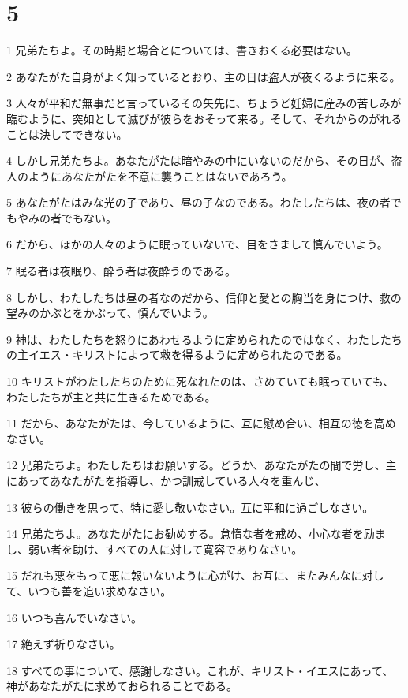 \chapter{5}

\par 1 兄弟たちよ。その時期と場合とについては、書きおくる必要はない。
\par 2 あなたがた自身がよく知っているとおり、主の日は盗人が夜くるように来る。
\par 3 人々が平和だ無事だと言っているその矢先に、ちょうど妊婦に産みの苦しみが臨むように、突如として滅びが彼らをおそって来る。そして、それからのがれることは決してできない。
\par 4 しかし兄弟たちよ。あなたがたは暗やみの中にいないのだから、その日が、盗人のようにあなたがたを不意に襲うことはないであろう。
\par 5 あなたがたはみな光の子であり、昼の子なのである。わたしたちは、夜の者でもやみの者でもない。
\par 6 だから、ほかの人々のように眠っていないで、目をさまして慎んでいよう。
\par 7 眠る者は夜眠り、酔う者は夜酔うのである。
\par 8 しかし、わたしたちは昼の者なのだから、信仰と愛との胸当を身につけ、救の望みのかぶとをかぶって、慎んでいよう。
\par 9 神は、わたしたちを怒りにあわせるように定められたのではなく、わたしたちの主イエス・キリストによって救を得るように定められたのである。
\par 10 キリストがわたしたちのために死なれたのは、さめていても眠っていても、わたしたちが主と共に生きるためである。
\par 11 だから、あなたがたは、今しているように、互に慰め合い、相互の徳を高めなさい。
\par 12 兄弟たちよ。わたしたちはお願いする。どうか、あなたがたの間で労し、主にあってあなたがたを指導し、かつ訓戒している人々を重んじ、
\par 13 彼らの働きを思って、特に愛し敬いなさい。互に平和に過ごしなさい。
\par 14 兄弟たちよ。あなたがたにお勧めする。怠惰な者を戒め、小心な者を励まし、弱い者を助け、すべての人に対して寛容でありなさい。
\par 15 だれも悪をもって悪に報いないように心がけ、お互に、またみんなに対して、いつも善を追い求めなさい。
\par 16 いつも喜んでいなさい。
\par 17 絶えず祈りなさい。
\par 18 すべての事について、感謝しなさい。これが、キリスト・イエスにあって、神があなたがたに求めておられることである。
